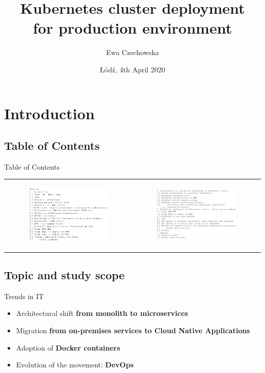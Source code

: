 \documentclass{beamer}
\title{Kubernetes cluster deployment \\ for production environment}
\author{Ewa Czechowska}
\institute{Technical University of Lodz}
\date{Łódź, 4th April 2020}
\begin{document}
\maketitle

\section{Introduction}
\subsection{Table of Contents}
\begin{frame}{Table of Contents}%
\begin{center}
\begin{tabular}{@{}  l  l }
	\begin{figure}
		\includegraphics[width=5.5cm]{figures/table-of-c1.png}
		\label{fig:table-of-c1}
	\end{figure} &
	\begin{figure}
		\includegraphics[width=5.5cm]{figures/table-of-c2.png}
		\label{fig:table-of-c2}
	\end{figure} \\
	\end{tabular}
\end{center}
\end{frame}

\subsection{Topic and study scope}
\begin{frame}{Trends in IT}%
\begin{itemize}
\item Architectural shift {\bfseries from monolith to microservices}
\item Migration {\bfseries from on-premises services to Cloud Native Applications}
\item Adoption of {\bfseries Docker containers}
\item Evolution of the movement: {\bfseries DevOps}
\end{itemize}
\end{frame}
\end{document}
